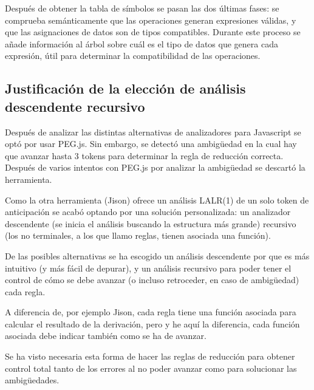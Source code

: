 \documentclass{report}
\begin{document}
	\vspace{10px}
	
	Después de obtener la tabla de símbolos se pasan las dos últimas fases: se comprueba semánticamente que las operaciones generan expresiones válidas, y que las asignaciones de datos son de tipos compatibles. Durante este proceso se añade información al árbol sobre cuál es el tipo de datos que genera cada expresión, útil para determinar la compatibilidad de las operaciones. 	
	
	\subsection{Justificación de la elección de análisis descendente recursivo}
	
	
	Después de analizar las distintas alternativas de analizadores para Javascript se optó por usar PEG.js. Sin embargo, se detectó una ambigüedad en la cual hay que avanzar hasta 3 tokens para determinar la regla de reducción correcta. Después de varios intentos con PEG.js por analizar la ambigüedad se descartó la herramienta. 
	
	\vspace{10px}
	
	Como la otra herramienta (Jison) ofrece un análisis LALR(1) de un solo token de anticipación se acabó optando por una solución personalizada: un analizador descendente (se inicia el análisis buscando la estructura más grande) recursivo (los no terminales, a los que llamo reglas, tienen asociada una función). 
	
	\vspace{10px}
	
	De las posibles alternativas se ha escogido un análisis descendente por que es más intuitivo (y más fácil de depurar), y un análisis recursivo para poder tener el control de cómo se debe avanzar (o incluso retroceder, en caso de ambigüedad) cada regla. 
	
	\vspace{10px}
	
	A diferencia de, por ejemplo Jison, cada regla tiene una función asociada para calcular el resultado de la derivación, pero y he aquí la diferencia, cada función asociada debe indicar también como se ha de avanzar.
	
	\vspace{10px}
	
	Se ha visto necesaria esta forma de hacer las reglas de reducción para obtener control total tanto de los errores al no poder avanzar como para solucionar las ambigüedades. 
	
\end{document}
